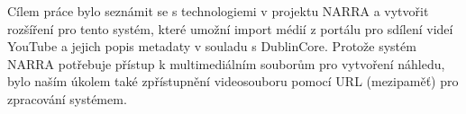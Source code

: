 \documentclass[thesis=B,czech]{FITthesis}[2012/06/26]
\begin{document}
\begin{conclusion}
	\par Cílem práce bylo seznámit se s technologiemi v projektu NARRA a vytvořit rozšíření pro tento systém, které umožní import médií z portálu pro sdílení videí YouTube a jejich popis metadaty v souladu s DublinCore. Protože systém NARRA potřebuje přístup k multimediálním souborům pro vytvoření náhledu, bylo naším úkolem také zpřístupnění videosouboru pomocí URL (mezipaměť) pro zpracování systémem. 

\end{conclusion}
\end{document}
